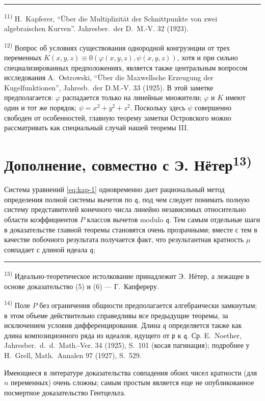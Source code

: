 \documentclass[11pt]{article}
\newcommand{\foreign}[1]{#1}
\theoremstyle{plain}
\begin{document}
\vspace{0.5em}
\noindent\rule{\textwidth}{0.4pt}
\vspace{0.3em}

{\footnotesize
\textsuperscript{11)} H.\ Kapferer, ``Über die Multiplizität der Schnittpunkte von zwei algebraischen
Kurven''. \foreign{Jahresber.\ der D.\ M.-V.} 32 (1923).

\textsuperscript{12)} Вопрос об условиях существования однородной конгруэнции
от трех переменных
$K(x,y,z) \equiv 0(\varphi(x,y,z), \psi(x,y,z))$, хотя и при сильно
специализированных предположениях, является также центральным
вопросом исследования A.\ Ostrowski, ``Über die Maxwellsche Erzeugung der
Kugelfunktionen'', \foreign{Jahresb.\ der D.M.-V.} 33 (1925). В этой
заметке предполагается: $\varphi$ распадается только на линейные
множители; $\varphi$ и $K$ имеют один и тот же порядок;
$\psi = x^{2} + y^{2} + z^{2}$. Поскольку здесь $\psi$ совершенно
свободен от особенностей, главную теорему заметки Островского можно
рассматривать как специальный случай нашей теоремы III.
}

\newpage
\section*{Дополнение, совместно с Э. Нётер\textsuperscript{13)}}

Система уравнений \eqref{eq:kap-1} одновременно дает рациональный
метод определения полной системы вычетов по $\mathfrak{q}$, под чем
следует понимать полную систему представителей конечного числа
линейно независимых относительно области коэффициентов $P$ классов
вычетов modulo $\mathfrak{q}$. Тем самым отдельные шаги в
доказательстве главной теоремы становятся очень прозрачными; вместе
с тем в качестве побочного результата получается факт, что
результантная кратность $\mu$ совпадает с длиной идеала
$\mathfrak{q}$;

\vspace{0.5em}
\noindent\rule{\textwidth}{0.4pt}
\vspace{0.3em}

{\footnotesize
\textsuperscript{13)} Идеально-теоретическое истолкование принадлежит
Э.\ Нётер, а лежащее в основе доказательство (5) и (6) --- Г.\ Капфереру.

\textsuperscript{14)} Поле $P$ без ограничения общности предполагается
алгебраически замкнутым; в этом объеме действительно справедливы все
предыдущие теоремы, за исключением условия дифференцирования. Длина
$\mathfrak{q}$ определяется также как длина композиционного ряда из
идеалов, идущего от $\mathfrak{p}$ к $\mathfrak{q}$. Ср. E.\ Noether,
\foreign{Jahresber.\ d.\ d.\ Math.-Ver.} 34 (1925), S.~101
(косая пагинация); подробнее у H.\ Grell, \foreign{Math.\ Annalen} 97
(1927), S.~529.

Имеющиеся в литературе доказательства совпадения обоих чисел
кратности (для $n$ переменных) очень сложны; самым простым является
еще не опубликованное посмертное доказательство Гентцельта.
}
\end{document}
